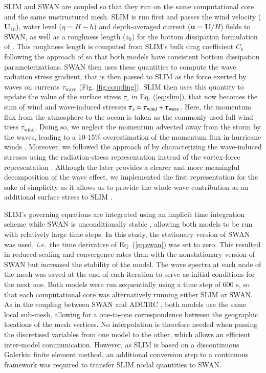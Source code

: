 \documentclass[preprint,12pt,authoryear]{elsarticle}
\newcommand{\ie}{{\it i.e.}\ }
\begin{document}
SLIM and SWAN are coupled so that they run on the same computational core and the same unstructured mesh. SLIM is run first and passes the wind velocity ($\mathbf{U}_{10}$), water level ($\eta=H-h$) and depth-averaged current ($\mathbf{u}=\mathbf{U}/H$) fields to SWAN, as well as a roughness length ($z_0$) for the bottom dissipation formulation of \cite{madsen1989spectral}. This roughness length is computed from SLIM's bulk drag coefficient $C_b$ following the approach of \cite{dietrich2011hurricane} so that both models have consistent bottom dissipation parameterizations. SWAN then uses these quantities to compute the wave radiation stress gradient, that is then passed to SLIM as the force exerted by waves on currents {\boldmath$\tau$}$_\text{wave}$ (Fig. \ref{fig:coupling}). SLIM then uses this quantity to update the value of the surface stress {\boldmath$\tau$}$_s$ in Eq. (\ref{eq:slim}), that now becomes the sum of wind and wave-induced stresses $\text{\boldmath$\tau$}_s = \text{\boldmath$\tau$}_\text{wind}+\text{\boldmath$\tau$}_\text{wave}$. Here, the momentum flux from the atmosphere to the ocean is taken as the commonly-used full wind tress {\boldmath$\tau$}$_\text{wind}$. Doing so, we neglect the momentum advected away from the storm by the waves, leading to a 10-15\% overestimation of the momentum flux in hurricane winds \citep{curcic2015explicit}. Moreover, we followed the approach of \cite{dietrich2012performance} by characterizing the wave-induced stresses using the radiation-stress representation instead of the vortex-force representation \citep{mcwilliams2004asymptotic}. Although the later provides a clearer and more meaningful decomposition of the wave effect, we implemented the first representation for the sake of simplicity as it allows us to provide the whole wave contribution as an additional surface stress to SLIM \citep{lane2007wave}.

SLIM's governing equations are integrated using an implicit time integration scheme while SWAN is unconditionally stable \citep{dietrich2012performance}, allowing both models to be run with relatively large time steps. In this study, the stationary version of SWAN was used, \ie the time derivative of Eq. (\ref{eq:swan}) was set to zero. This resulted in reduced scaling and convergence rates than with the nonstationary version of SWAN but increased the stability of the model. The wave spectra at each node of the mesh was saved at the end of each iteration to serve as initial conditions for the next one. Both models were run sequentially using a time step of 600 s, so that each computational core was alternatively running either SLIM or SWAN. As in the coupling between SWAN and ADCIRC \citep{dietrich2012performance}, both models use the same local sub-mesh, allowing for a one-to-one correspondence between the geographic locations of the mesh vertices. No interpolation is therefore needed when passing the discretised variables from one model to the other, which allows an efficient inter-model communication. However, as SLIM is based on  a discontinuous Galerkin finite element method, an additional conversion step to a continuous framework was required to transfer SLIM nodal quantities to SWAN.  
\end{document}
